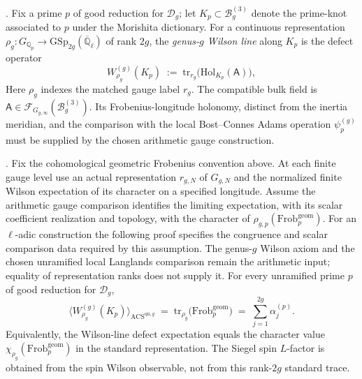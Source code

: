 \begin{definition}
\label{v4-arith:w9-r6:def:wilson-line-g}
\ClaimStatusDefinitional. Fix a prime \(p\) of good reduction for
\(\mathcal{D}_{g}\); let \(K_{p}\subset\mathcal{B}_{g}^{(3)}\) denote the
prime-knot associated to \(p\) under the Morishita dictionary. For a
continuous representation
\(\rho_{g}:G_{\mathbb{Q}_{p}}\to\mathrm{GSp}_{2g}(\overline{\mathbb{Q}}_{\ell})\)
of rank \(2g\), the \emph{genus-\(g\) Wilson line} along \(K_{p}\) is the
defect operator
\begin{equation}
\label{v4-arith:w9-r6:eq:wilson-line-def}
W^{(g)}_{\rho_{g}}(K_{p})\;:=\;\mathrm{tr}_{r_g}\bigl(\mathrm{Hol}_{K_{p}}(\mathsf{A})\bigr),
\end{equation}
Here $\rho_g$ indexes the matched gauge label $r_g$.
The compatible bulk field is
$\mathsf A\in\mathcal F_{G_{g,\infty}}(\mathcal B_g^{(3)})$.
Its Frobenius-longitude holonomy, distinct from the inertia meridian,
and the comparison with the local
Bost--Connes Adams operation $\psi_p^{(g)}$ must be supplied by
the chosen arithmetic gauge construction.
\end{definition}

\begin{theorem}
\label{v4-arith:w9-r6:thm:wilson-frobenius-g}
\ClaimStatusProvedHereConditional. Fix the cohomological geometric
Frobenius convention above. At each finite gauge level use an actual
representation $r_{g,N}$ of $G_{g,N}$ and the normalized finite
Wilson expectation of its character on a specified longitude.
Assume the arithmetic gauge comparison identifies the limiting
expectation, with its scalar coefficient realization and topology,
with the character of $\rho_{g,p}(\mathrm{Frob}_p^{\mathrm{geom}})$.
For an $\ell$-adic construction the following proof specifies the
congruence and scalar comparison data required by this assumption.
The genus-$g$ Wilson axiom and the chosen unramified local Langlands
comparison remain the arithmetic input; equality of representation
ranks does not supply it. For every unramified prime \(p\) of
good reduction for \(\mathcal{D}_{g}\),
\begin{equation}
\label{v4-arith:w9-r6:eq:wilson-frobenius-g}
\langle W^{(g)}_{\rho_{g}}(K_{p})\rangle_{\mathrm{ACS}^{\mathrm{qu},g}}
\;=\;\mathrm{tr}_{\rho_{g}}\bigl(\mathrm{Frob}_{p}^{\mathrm{geom}}\bigr)
\;=\;\sum_{j=1}^{2g}\alpha_{j}^{(p)}.
\end{equation}
Equivalently, the Wilson-line defect expectation equals the character value
\(\chi_{\rho_{g}}(\mathrm{Frob}_{p}^{\mathrm{geom}})\) in the standard representation.
The Siegel spin \(L\)-factor is obtained from the spin Wilson observable,
not from this rank-\(2g\) standard trace.
\end{theorem}

